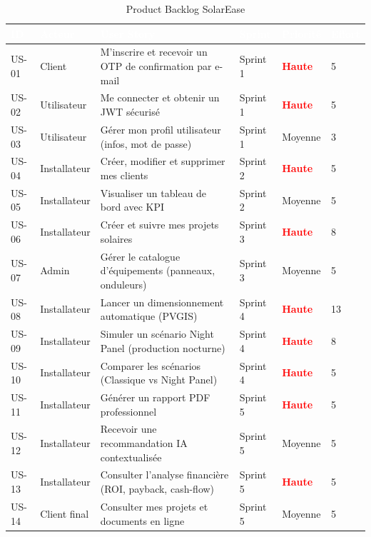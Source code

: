 \begin{table}[H]
  \caption{Product Backlog SolarEase}
  \label{tab:backlog}
  \centering
  \small
  \begin{tabularx}{\textwidth}{|C{1cm}|L{2cm}|X|C{1.4cm}|C{1.4cm}|C{1cm}|}
    \hline
    \textcolor{white}{\textbf{ID}} &
    \textcolor{white}{\textbf{Acteur}} &
    \textcolor{white}{\textbf{User Story}} &
    \textcolor{white}{\textbf{Sprint}} &
    \textcolor{white}{\textbf{Priorité}} &
    \textcolor{white}{\textbf{Effort}} \\
    \hline
    US-01 & Client & M'inscrire et recevoir un OTP de confirmation par e-mail & Sprint 1 & \textcolor{red}{\textbf{Haute}} & 5 \\
    \hline
    US-02 & Utilisateur & Me connecter et obtenir un JWT sécurisé & Sprint 1 & \textcolor{red}{\textbf{Haute}} & 5 \\
    \hline
    US-03 & Utilisateur & Gérer mon profil utilisateur (infos, mot de passe) & Sprint 1 & Moyenne & 3 \\
    \hline
    US-04 & Installateur & Créer, modifier et supprimer mes clients & Sprint 2 & \textcolor{red}{\textbf{Haute}} & 5 \\
    \hline
    US-05 & Installateur & Visualiser un tableau de bord avec KPI & Sprint 2 & Moyenne & 5 \\
    \hline
    US-06 & Installateur & Créer et suivre mes projets solaires & Sprint 3 & \textcolor{red}{\textbf{Haute}} & 8 \\
    \hline
    US-07 & Admin & Gérer le catalogue d'équipements (panneaux, onduleurs) & Sprint 3 & Moyenne & 5 \\
    \hline
    US-08 & Installateur & Lancer un dimensionnement automatique (PVGIS) & Sprint 4 & \textcolor{red}{\textbf{Haute}} & 13 \\
    \hline
    US-09 & Installateur & Simuler un scénario Night Panel (production nocturne) & Sprint 4 & \textcolor{red}{\textbf{Haute}} & 8 \\
    \hline
    US-10 & Installateur & Comparer les scénarios (Classique vs Night Panel) & Sprint 4 & \textcolor{red}{\textbf{Haute}} & 5 \\
    \hline
    US-11 & Installateur & Générer un rapport PDF professionnel & Sprint 5 & \textcolor{red}{\textbf{Haute}} & 5 \\
    \hline
    US-12 & Installateur & Recevoir une recommandation IA contextualisée & Sprint 5 & Moyenne & 5 \\
    \hline
    US-13 & Installateur & Consulter l'analyse financière (ROI, payback, cash-flow) & Sprint 5 & \textcolor{red}{\textbf{Haute}} & 5 \\
    \hline
    US-14 & Client final & Consulter mes projets et documents en ligne & Sprint 5 & Moyenne & 5 \\
    \hline
  \end{tabularx}
\end{table}

